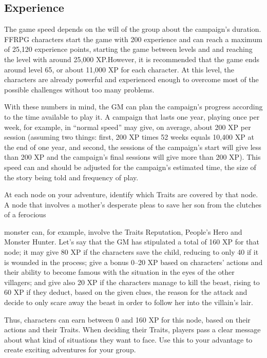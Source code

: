 \subsection{Experience}\label{subsec:gm-experience}
\begin{multicols}{2}
The game speed depends on the will of the group about the campaign’s duration. FFRPG characters start the game with 200 experience and can reach a maximum of 25,120 experience points, starting the game between levels  and  and reaching the  level with around 25,000 XP.\@{}However, it is recommended that the game ends around level 65, or about 11,000 XP for each character. At this level, the characters are already powerful and experienced enough to overcome most of the possible challenges without too many problems.

With these numbers in mind, the GM can plan the campaign’s progress according to the time available to play it. A campaign that lasts one year, playing once per week, for example, in ``normal speed'' may give, on average, about 200 XP per session (assuming two things: first, 200 XP times 52 weeks equals 10,400 XP at the end of one year, and second, the sessions of the campaign’s start will give less than 200 XP and the campaign’s final sessions will give more than 200 XP). This speed can and should be adjusted for the campaign’s estimated time, the size of the story being told and frequency of play.

At each node on your
adventure, identify which Traits
are covered by that node. A node
that involves a mother’s
desperate pleas to save her son
from the clutches of a ferocious

monster can, for example, involve the Traits Reputation, People’s Hero and Monster Hunter. Let's say that the GM has stipulated a total of 160 XP for that node; it may give 80 XP if the characters save the child, reducing to only 40 if it is wounded in the process; give a bonus 0--20 XP based on characters’ actions and their ability to become famous with the situation in the eyes of the other villagers; and give also 20 XP if the characters manage to kill the beast, rising to 60 XP if they deduct, based on the given clues, the reason for the attack and decide to only scare away the beast in order to follow her into the villain's lair.

Thus, characters can earn between 0 and 160 XP for this node, based on their actions and their Traits. When deciding their Traits, players pass a clear message about what kind of situations they want to face. Use this to your advantage to create exciting adventures for your group.


\end{multicols}

